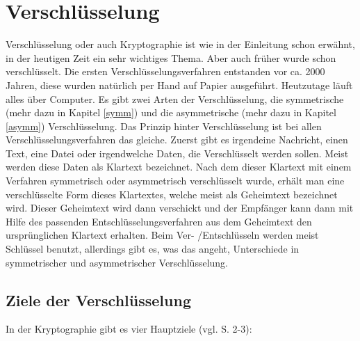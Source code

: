 \documentclass[a4paper,12pt,titlepage]{article}
\begin{document}
\section{Verschlüsselung} \label{crypt}
Verschlüsselung oder auch Kryptographie ist wie in der Einleitung schon erwähnt, in der heutigen Zeit ein sehr wichtiges Thema. Aber auch früher wurde schon verschlüsselt. Die ersten Verschlüsselungsverfahren entstanden vor ca. 2000 Jahren, diese wurden natürlich per Hand auf Papier ausgeführt. Heutzutage läuft alles über Computer. \newline Es gibt zwei Arten der Verschlüsselung, die symmetrische (mehr dazu in Kapitel \ref{symm}) und die asymmetrische (mehr dazu in Kapitel \ref{asymm}) Verschlüsselung. Das Prinzip hinter Verschlüsselung ist bei allen Verschlüsselungsverfahren das gleiche. Zuerst gibt es irgendeine Nachricht, einen Text, eine Datei oder irgendwelche Daten, die Verschlüsselt werden sollen. Meist werden diese Daten als Klartext bezeichnet. Nach dem dieser Klartext mit einem Verfahren symmetrisch oder asymmetrisch verschlüsselt wurde, erhält man eine verschlüsselte Form dieses Klartextes, welche meist als Geheimtext bezeichnet wird. Dieser Geheimtext wird dann verschickt und der Empfänger kann dann mit Hilfe des passenden Entschlüsselungsverfahren aus dem Geheimtext den ursprünglichen Klartext erhalten. Beim Ver- /Entschlüsseln werden meist Schlüssel benutzt, allerdings gibt es, was das angeht, Unterschiede in symmetrischer und asymmetrischer Verschlüsselung.

\subsection{Ziele der Verschlüsselung}\label{crypt:goals}
In der Kryptographie gibt es vier Hauptziele (vgl. \cite{delfs_knebl} S. 2-3):
\end{document}
